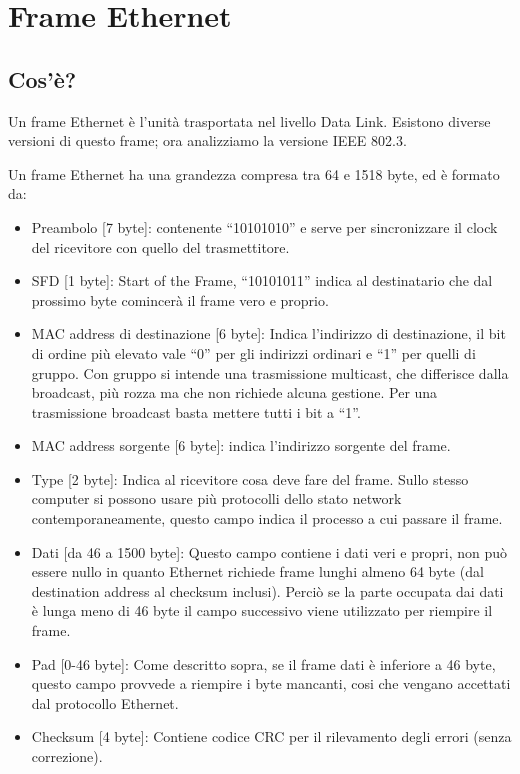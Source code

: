 \section{Frame Ethernet}
\subsection{Cos'è?}
Un frame Ethernet è l'unità trasportata nel livello Data Link.
Esistono diverse versioni di questo frame; ora analizziamo la versione IEEE 802.3. 

Un frame Ethernet ha una grandezza compresa tra 64 e 1518 byte, ed è formato da:
\begin{itemize}
\item	Preambolo [7 byte]: contenente “10101010” e serve per sincronizzare il clock del ricevitore con quello del trasmettitore.
\item	SFD [1 byte]: Start of the Frame, “10101011” indica al destinatario che dal prossimo byte comincerà il frame vero e proprio.
\item	MAC address di destinazione [6 byte]: Indica l'indirizzo di destinazione, il bit di ordine più elevato vale “0” per gli indirizzi ordinari e “1” per quelli di gruppo. Con gruppo si intende una trasmissione multicast, che differisce dalla broadcast, più rozza ma che non richiede alcuna gestione. Per una trasmissione broadcast basta mettere tutti i bit a “1”.
\item	MAC address sorgente [6 byte]: indica l'indirizzo sorgente del frame.
\item	Type [2 byte]: Indica al ricevitore cosa deve fare del frame. Sullo stesso computer si possono usare più protocolli dello stato network contemporaneamente, questo campo indica il processo a cui passare il frame.
\item	Dati [da 46 a 1500 byte]: Questo campo contiene i dati veri e propri, non può essere nullo in quanto Ethernet richiede frame lunghi almeno 64 byte (dal destination address al checksum inclusi). Perciò se la parte occupata dai dati è lunga meno di 46 byte il campo successivo viene utilizzato per riempire il frame.
\item	Pad [0-46 byte]: Come descritto sopra, se il frame dati è inferiore a 46 byte, questo campo provvede a riempire i byte mancanti, cosi che vengano accettati dal protocollo Ethernet.
\item	Checksum [4 byte]: Contiene codice CRC per il rilevamento degli errori (senza correzione).
\end{itemize}


